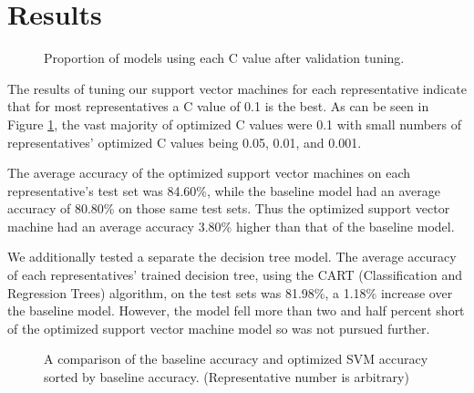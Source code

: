 \documentclass[11pt,letterpaper,twocolumn]{article}
\begin{document}
\section{Results}

\begin{figure}
\centering
{}
\caption{Proportion of models using each C value after validation tuning.}
\label{fig:1}
\end{figure} 

The results of tuning our support vector machines for each representative indicate that for most representatives a C value of 0.1 is the best. As can be seen in Figure \ref{fig:1}, the vast majority of optimized C values were 0.1 with small numbers of representatives' optimized C values being 0.05, 0.01, and 0.001.

The average accuracy of the optimized support vector machines on each representative's test set was 84.60\%, while the baseline model had an average accuracy of 80.80\% on those same test sets. Thus the optimized support vector machine had an average accuracy 3.80\% higher than that of the baseline model. 

We additionally tested a separate the decision tree model. The average accuracy of each representatives' trained decision tree, using the CART (Classification and Regression Trees) algorithm, on the test sets was 81.98\%, a 1.18\% increase over the baseline model. However, the model fell more than two and half percent short of the optimized support vector machine model so was not pursued further.

\begin{figure}[t]
\centering
{}
\caption{A comparison of the baseline accuracy and optimized SVM accuracy sorted by baseline accuracy. (Representative number is arbitrary)}
\label{fig:3}
\end{figure}
\end{document}
